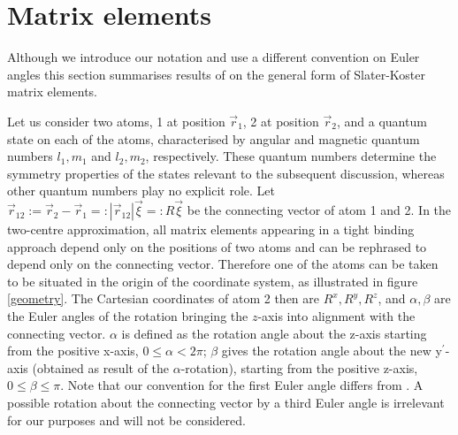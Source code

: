 \section{Matrix elements}
\label{ME}
%
\par{Although we introduce our notation and use a different convention on Euler
angles this section summarises results
of \citep{Podolskiy04} on the general form of Slater-Koster matrix elements.}
\par{Let us consider two atoms, 1 at position $\vec{r}_{1}$, 2 at position $\vec{r}_{2}$, and a quantum
state on each of the atoms, characterised by angular and magnetic quantum numbers \(l_1,m_1\)
and \(l_2,m_2\), respectively. These quantum numbers determine the
symmetry properties of the states relevant to the subsequent discussion, whereas other quantum numbers play
no explicit role.
Let $\vec{r}_{12}:=\vec{r}_{2}-\vec{r}_{1}=:|\vec{r}_{12}|\vec{\xi}=:R\vec{\xi}$ be
the connecting vector of atom 1 and 2. In the two-centre approximation, all matrix elements appearing in
a tight binding approach depend only on the positions of two atoms and can be rephrased to depend only
on the connecting vector. Therefore one of the atoms can be taken to be situated in the origin of
the coordinate system, as illustrated in figure \ref{geometry}. The Cartesian coordinates of
atom 2 then are
\(R^x,R^y,R^z\), and $\alpha,\beta$ are the Euler angles of the rotation bringing the $z$-axis into
alignment with the connecting vector. $\alpha$ is defined as the
rotation angle about the z-axis starting from the positive x-axis, $0\le\alpha<2\pi$; $\beta$ gives the
rotation angle about the new y$^{\prime}$-axis (obtained as result of the $\alpha$-rotation),
starting from the positive z-axis, $0\le\beta\le\pi$. Note that our convention for the first Euler angle
differs from \citep{Podolskiy04}. A possible rotation about the connecting vector by a third Euler angle is
irrelevant for our purposes and will not be considered. }
%
